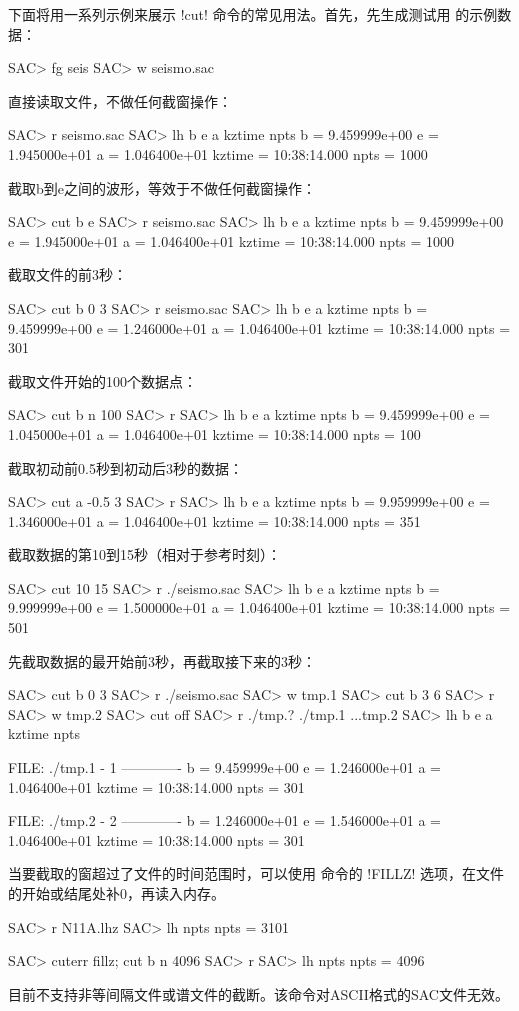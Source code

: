 下面将用一系列示例来展示 !cut! 命令的常见用法。首先，先生成测试用
的示例数据：
\begin{SACCode}
SAC> fg seis
SAC> w seismo.sac
\end{SACCode}
直接读取文件，不做任何截窗操作：
\begin{SACCode}
SAC> r seismo.sac
SAC> lh b e a kztime npts
          b = 9.459999e+00
          e = 1.945000e+01
          a = 1.046400e+01
     kztime = 10:38:14.000
       npts = 1000
\end{SACCode}
截取b到e之间的波形，等效于不做任何截窗操作：
\begin{SACCode}
SAC> cut b e
SAC> r seismo.sac
SAC> lh b e a kztime npts
          b = 9.459999e+00
          e = 1.945000e+01
          a = 1.046400e+01
     kztime = 10:38:14.000
       npts = 1000
\end{SACCode}
截取文件的前3秒：
\begin{SACCode}
SAC> cut b 0 3
SAC> r seismo.sac
SAC> lh b e a kztime npts
          b = 9.459999e+00
          e = 1.246000e+01
          a = 1.046400e+01
     kztime = 10:38:14.000
       npts = 301
\end{SACCode}
截取文件开始的100个数据点：
\begin{SACCode}
SAC> cut b n 100
SAC> r
SAC> lh b e a kztime npts
          b = 9.459999e+00
          e = 1.045000e+01
          a = 1.046400e+01
     kztime = 10:38:14.000
       npts = 100
\end{SACCode}
截取初动前0.5秒到初动后3秒的数据：
\begin{SACCode}
SAC> cut a -0.5 3
SAC> r
SAC> lh b e a kztime npts
          b = 9.959999e+00
          e = 1.346000e+01
          a = 1.046400e+01
     kztime = 10:38:14.000
       npts = 351
\end{SACCode}
截取数据的第10到15秒（相对于参考时刻）：
\begin{SACCode}
SAC> cut 10 15
SAC> r ./seismo.sac
SAC> lh b e a kztime npts
          b = 9.999999e+00
          e = 1.500000e+01
          a = 1.046400e+01
     kztime = 10:38:14.000
       npts = 501
\end{SACCode}

先截取数据的最开始前3秒，再截取接下来的3秒：
\begin{SACCode}
SAC> cut b 0 3
SAC> r ./seismo.sac
SAC> w tmp.1
SAC> cut b 3 6
SAC> r
SAC> w tmp.2
SAC> cut off
SAC> r ./tmp.?
./tmp.1 ...tmp.2
SAC> lh b e a kztime npts

  FILE: ./tmp.1 - 1
 -------------
          b = 9.459999e+00
          e = 1.246000e+01
          a = 1.046400e+01
     kztime = 10:38:14.000
       npts = 301

  FILE: ./tmp.2 - 2
 -------------
          b = 1.246000e+01
          e = 1.546000e+01
          a = 1.046400e+01
     kztime = 10:38:14.000
       npts = 301
\end{SACCode}

当要截取的窗超过了文件的时间范围时，可以使用  命令的
!FILLZ! 选项，在文件的开始或结尾处补0，再读入内存。
\begin{SACCode}
SAC> r N11A.lhz
SAC> lh npts
    npts = 3101

SAC> cuterr fillz; cut b n 4096
SAC> r
SAC> lh npts
    npts = 4096
\end{SACCode}

目前不支持非等间隔文件或谱文件的截断。该命令对ASCII格式的SAC文件无效。
